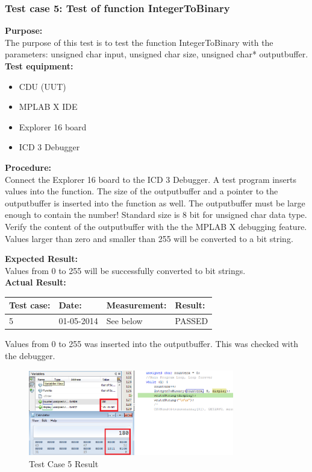 \subsubsection{Test case 5: Test of function IntegerToBinary }
\textbf{Purpose:}\\
The purpose of this test is to test the function IntegerToBinary with the parameters: unsigned char input, unsigned char size, unsigned char* outputbuffer.\\

\textbf{Test equipment:}
\begin{itemize}
\item CDU (UUT)
\item MPLAB X IDE
\item Explorer 16 board
\item ICD 3 Debugger
\end{itemize}

\textbf{Procedure:}\\
Connect the Explorer 16 board to the ICD 3 Debugger. A test program inserts values into the function. The size of the outputbuffer and a pointer to the outputbuffer is inserted into the function as well. The outputbuffer must be large enough to contain the number! Standard size is 8 bit for unsigned char data type.\\
Verify the content of the outputbuffer with the the MPLAB X debugging feature. Values larger than zero and smaller than 255 will be converted to a bit string. 

\textbf{Expected Result:}\\
Values from 0 to 255  will be successfully converted to bit strings.\\

\textbf{Actual Result:}\\
\begin{table}[H]
\centering
\begin{tabular}{|p{2cm}|p{2cm}|p{3cm}|p{2cm}|}\hline
\textbf{Test case:} & \textbf{Date:} & \textbf{Measurement:} & \textbf{Result:} \\ \hline
5 & 01-05-2014 & See below & PASSED \\ \hline
\end{tabular}
\end{table}
Values from 0 to 255 was inserted into the outputbuffer. This was checked with the debugger.\\
\begin{figure}[H]
\centering
\includegraphics[width=0.8\textwidth]{billeder/CDUtestcase5}
\caption{Test Case 5 Result}
\label{fig:cdutestcase5}
\end{figure} 

